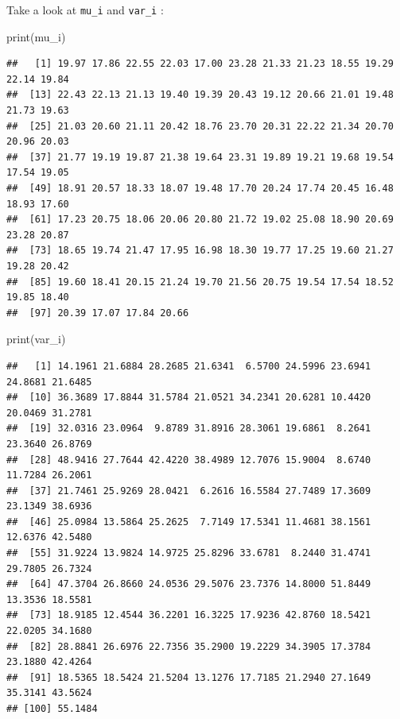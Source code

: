 \documentclass[
]{book}
\newenvironment{Shaded}{\begin{snugshade}}{\end{snugshade}}
\newcommand{\FunctionTok}[1]{\textcolor[rgb]{0.00,0.00,0.00}{#1}}
\newcommand{\NormalTok}[1]{#1}
\begin{document}
Take a look at \texttt{mu\_i} and \texttt{var\_i} :

\begin{Shaded}
\begin{Highlighting}[]
\FunctionTok{print}\NormalTok{(mu\_i)}
\end{Highlighting}
\end{Shaded}

\begin{verbatim}
##   [1] 19.97 17.86 22.55 22.03 17.00 23.28 21.33 21.23 18.55 19.29 22.14 19.84
##  [13] 22.43 22.13 21.13 19.40 19.39 20.43 19.12 20.66 21.01 19.48 21.73 19.63
##  [25] 21.03 20.60 21.11 20.42 18.76 23.70 20.31 22.22 21.34 20.70 20.96 20.03
##  [37] 21.77 19.19 19.87 21.38 19.64 23.31 19.89 19.21 19.68 19.54 17.54 19.05
##  [49] 18.91 20.57 18.33 18.07 19.48 17.70 20.24 17.74 20.45 16.48 18.93 17.60
##  [61] 17.23 20.75 18.06 20.06 20.80 21.72 19.02 25.08 18.90 20.69 23.28 20.87
##  [73] 18.65 19.74 21.47 17.95 16.98 18.30 19.77 17.25 19.60 21.27 19.28 20.42
##  [85] 19.60 18.41 20.15 21.24 19.70 21.56 20.75 19.54 17.54 18.52 19.85 18.40
##  [97] 20.39 17.07 17.84 20.66
\end{verbatim}

\begin{Shaded}
\begin{Highlighting}[]
\FunctionTok{print}\NormalTok{(var\_i)}
\end{Highlighting}
\end{Shaded}

\begin{verbatim}
##   [1] 14.1961 21.6884 28.2685 21.6341  6.5700 24.5996 23.6941 24.8681 21.6485
##  [10] 36.3689 17.8844 31.5784 21.0521 34.2341 20.6281 10.4420 20.0469 31.2781
##  [19] 32.0316 23.0964  9.8789 31.8916 28.3061 19.6861  8.2641 23.3640 26.8769
##  [28] 48.9416 27.7644 42.4220 38.4989 12.7076 15.9004  8.6740 11.7284 26.2061
##  [37] 21.7461 25.9269 28.0421  6.2616 16.5584 27.7489 17.3609 23.1349 38.6936
##  [46] 25.0984 13.5864 25.2625  7.7149 17.5341 11.4681 38.1561 12.6376 42.5480
##  [55] 31.9224 13.9824 14.9725 25.8296 33.6781  8.2440 31.4741 29.7805 26.7324
##  [64] 47.3704 26.8660 24.0536 29.5076 23.7376 14.8000 51.8449 13.3536 18.5581
##  [73] 18.9185 12.4544 36.2201 16.3225 17.9236 42.8760 18.5421 22.0205 34.1680
##  [82] 28.8841 26.6976 22.7356 35.2900 19.2229 34.3905 17.3784 23.1880 42.4264
##  [91] 18.5365 18.5424 21.5204 13.1276 17.7185 21.2940 27.1649 35.3141 43.5624
## [100] 55.1484
\end{verbatim}
\end{document}
